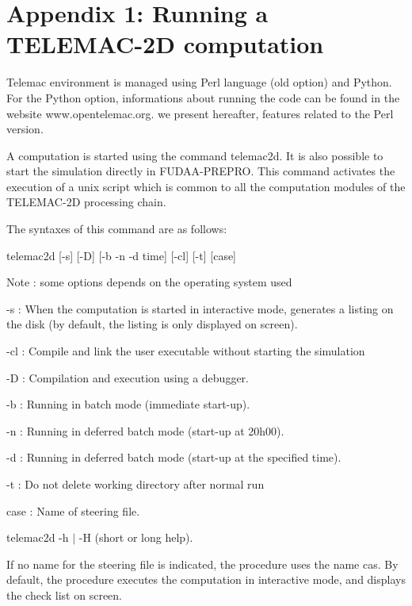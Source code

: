 




\chapter{Appendix 1: Running a TELEMAC-2D computation}



 Telemac environment is managed using Perl language (old option) and Python. For the Python option, informations about running the code can be found in the website www.opentelemac.org. we present hereafter, features related to the Perl version.

 A computation is started using the command telemac2d. It is also possible to start the simulation directly in FUDAA-PREPRO. This command activates the execution of a unix script which is common to all the computation modules of the TELEMAC-2D processing chain.

 The syntaxes of this command are as follows:

 telemac2d [-s] [-D] [-b {\textbar} -n {\textbar} -d time] [-cl] [-t] [case]

 Note : some options depends on the operating system used



 -s : When the computation is started in interactive mode, generates a listing on the disk (by default, the listing is only displayed on screen).

 -cl : Compile and link the user executable without starting the simulation

 -D : Compilation and execution using a debugger.

 -b : Running in batch mode (immediate start-up).

 -n : Running in deferred batch mode (start-up at 20h00).

 -d : Running in deferred batch mode (start-up at the specified time).

 -t : Do not delete working directory after normal run

 case : Name of steering file.



  telemac2d  -h $\mid$ -H  (short or long help).





 If no name for the steering file is indicated, the procedure uses the name cas. By default, the procedure executes the computation in interactive mode, and displays the check list on screen.


